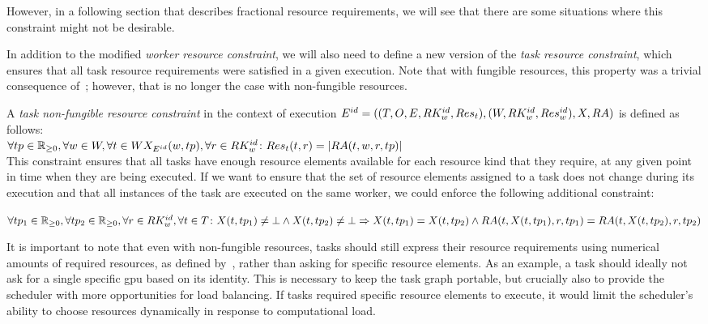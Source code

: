 However, in a following section that describes fractional resource requirements, we will see that
there are some situations where this constraint might not be desirable.

In addition to the modified \emph{worker resource constraint}, we will also need to define a new version of
the \emph{task resource constraint}, which ensures that all task resource requirements were satisfied in a
given execution. Note that with fungible resources, this property was a trivial consequence
of~; however, that is no longer the case with non-fungible resources.

\vspace{2mm} A
\emph{task non-fungible resource constraint} in the context of execution $E^{id} = ((T, O, E, RK_w^{id}, Res_t), (W, RK_w^{id}, Res_w^{id}), X,
RA)$ is defined as
follows: \vspace{1mm}\\
$\forall tp\in\mathbb{R}_{\geq{}0}, \forall w\in{}W, \forall
	t\in{}WX_{E^{id}}(w, tp), \forall
	r\in{}RK_w^{id}\colon Res_t(t, r) =
	|RA(t, w, r, tp)|$ \\

This constraint ensures that all tasks have enough resource elements available for each resource
kind that they require, at any given point in time when they are being executed. If we want to
ensure that the set of resource elements assigned to a task does not change during its
execution and that all instances of the task are executed on the same worker, we could enforce the
following additional constraint:

\vspace{1mm}
$\forall tp_1\in\mathbb{R}_{\geq{}0}, \forall tp_2\in\mathbb{R}_{\geq{}0}, \forall r\in RK_w^{id}, \forall t\in{}T\colon
X(t, tp_1) \neq \bot \land X(t, tp_2) \neq \bot \Rightarrow X(t, tp_1) = X(t, tp_2) \land RA(t, X(t, tp_1), r, tp_1) =
RA(t, X(t, tp_2), r, tp_2)$

\vspace{1mm}It is important to note that even with non-fungible resources, tasks should still
express their resource requirements using numerical amounts of required resources, as defined
by~, rather than asking for specific resource elements. As an example, a
task should ideally not ask for a single specific \gls{gpu} based on its identity. This is
necessary to keep the task graph portable, but crucially also to provide the scheduler with more opportunities
for load balancing. If tasks required specific resource elements to execute, it would limit the
scheduler's ability to choose resources dynamically in response to computational load.

